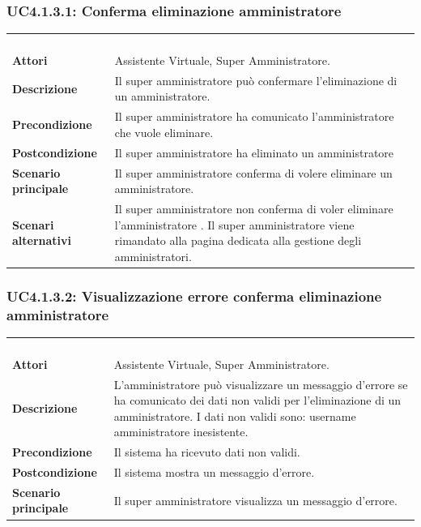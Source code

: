 \subsubsection{UC4.1.3.1: Conferma eliminazione amministratore}
\label{UC4.1.3.1}
\begin{longtable}{l|p{10cm}}
\rowcolor[gray]{0.8} \multicolumn{2}{c}{} \\
\rowcolor[gray]{0.8} \multicolumn{2}{c}{\textbf{UC4.1.3.1 - Conferma eliminazione amministratore}} \\
\rowcolor[gray]{0.8} \multicolumn{2}{c}{} \\
\hline
&\\
\textbf{Attori} & Assistente Virtuale, Super Amministratore.\\[7pt]
\textbf{Descrizione} & Il super amministratore può confermare l'eliminazione di un amministratore.\\[7pt]
\textbf{Precondizione} & Il super amministratore ha comunicato l'amministratore che vuole eliminare.\\[7pt]
\textbf{Postcondizione} & Il super amministratore ha eliminato un amministratore\\[7pt]
\textbf{Scenario principale} &Il super amministratore conferma di volere eliminare un amministratore.\\[7pt]
\textbf{Scenari alternativi} & Il super amministratore non conferma di voler eliminare l'amministratore . Il super amministratore viene rimandato alla pagina dedicata alla gestione degli amministratori.\\[7pt]\hline
\end{longtable}

\subsubsection{UC4.1.3.2: Visualizzazione errore conferma eliminazione amministratore}
\label{UC4.1.3.2}
\begin{longtable}{l|p{10cm}}
\rowcolor[gray]{0.8} \multicolumn{2}{c}{} \\
\rowcolor[gray]{0.8} \multicolumn{2}{c}{\textbf{UC4.1.3.2 - Visualizzazione errore conferma eliminazione amministratore}} \\
\rowcolor[gray]{0.8} \multicolumn{2}{c}{} \\
\hline
&\\
\textbf{Attori} & Assistente Virtuale, Super Amministratore.\\[7pt]
\textbf{Descrizione} & L'amministratore può visualizzare un messaggio d'errore se ha comunicato dei dati non validi per l'eliminazione di un amministratore.
I dati non validi sono: username amministratore inesistente.\\[7pt]
\textbf{Precondizione} & Il sistema ha ricevuto dati non validi.\\[7pt]
\textbf{Postcondizione} & Il sistema mostra un messaggio d'errore.\\[7pt]
\textbf{Scenario principale} &Il super amministratore visualizza un messaggio d'errore.\\[7pt]\hline
\end{longtable}

